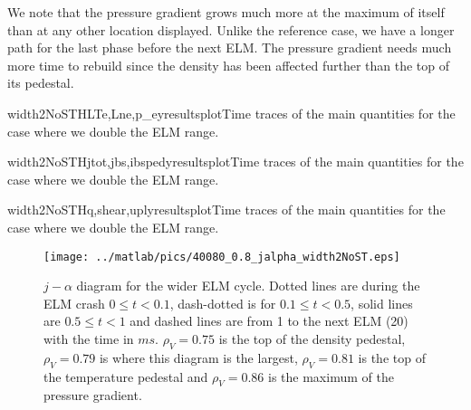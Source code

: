 We note that the pressure gradient grows much more at the maximum of itself than at any other location displayed. Unlike the reference case, we have a longer path for the last phase before the next ELM. The pressure gradient needs much more time to rebuild since the density has been affected further than the top of its pedestal.

\begin{AllFigs}{width2NoST}{H}{}{LTe,Lne,p_e}{y}{resultsplot}{Time traces of the main quantities for the case where we double the ELM range.}
\end{AllFigs}
\begin{AllFigs}{width2NoST}{H}{}{jtot,jbs,ibsped}{y}{resultsplot}{Time traces of the main quantities for the case where we double the ELM range.}
\end{AllFigs}
\begin{AllFigs}{width2NoST}{H}{}{q,shear,upl}{y}{resultsplot}{Time traces of the main quantities for the case where we double the ELM range.}
\end{AllFigs}
\begin{figure}[H]
\begin{center}
\texttt{[image: ../matlab/pics/40080\_0.8\_jalpha\_width2NoST.eps]}
\vspace{-0.5cm}
\end{center}
\caption{\footnotesize $j - \alpha$ diagram for the wider ELM cycle. Dotted lines are during the ELM crash $0 \le t <0.1$, dash-dotted is for $0.1 \le t < 0.5$, solid lines are $0.5 \le t < 1$ and dashed lines are from 1 to the next ELM (20) with the time in $ms$. $\rho_V = 0.75$ is the top of the density pedestal, $\rho_V = 0.79$ is where this diagram is the largest, $\rho_V = 0.81$ is the top of the temperature pedestal and $\rho_V = 0.86$ is the maximum of the pressure gradient.\label{fig:results:ELM:width2:jalpha}}
\vspace{-0.5cm}
\end{figure}
